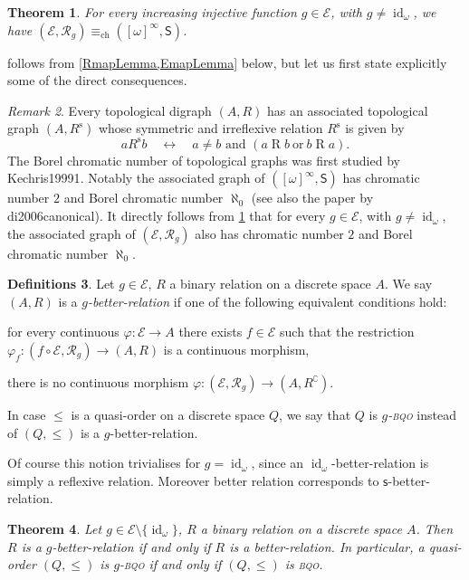\documentclass{article}%
\newcommand\textcite{}
\theoremstyle{plain}
\newtheorem{theorem}{Theorem}
\newtheorem{theorem}{Theorem}[section]
\theoremstyle{definition}
\newtheorem{definition}[theorem]{Definition}
\newtheorem{definition}[theorem]{Notation}
\newtheorem{definition}[theorem]{Notations}
\newtheorem{definition}[theorem]{Definitions}
\theoremstyle{remark}
\newtheorem{remark}[theorem]{Remark}
\newcommand{\bqo}{\textsc{bqo}}
\newcommand{\contMorEq}{\equiv_{\text{ch}}}
\DeclareMathOperator{\id}{\mathrm{id}} %
\newcommand{\SSI}{\quad\longleftrightarrow\quad} %
\newcommand{\SHIFT}{\mathsf{S}}
\newcommand{\infSub}[1]{[#1]^{\infty}}
\newcommand{\Su}{\mathsf{s}}
\newcommand{\IIf}{\mathcal{E}}
\newcommand{\rtrans}[1]{\mathcal{R}_{#1}}
\begin{document}
\begin{theorem}\label{MainProp}
For every increasing injective function $g\in \IIf$, with $g\neq \id_{\omega}$, we have $(\IIf, \rtrans{g})\contMorEq (\infSub{\omega},\SHIFT)$.
\end{theorem}



 follows from \cref{RmapLemma,EmapLemma} below, but let us first state explicitly some of the direct consequences.

\begin{remark}
Every topological digraph $(A,R)$ has an associated topological graph $(A,R^{\text{s}})$ whose symmetric and irreflexive relation $R^{\text{s}}$ is given by
\[
a\mathrel{R^{\text{s}}}b\SSI a\neq b\text{ and } (a\mathrel{R}b \ \text{or}\ b\mathrel{R}a ).
\]
The Borel chromatic number of topological graphs was first studied by \textcite{Kechris19991}. 
Notably the associated graph of $(\infSub{\omega},\SHIFT)$ has chromatic number $2$ and Borel chromatic number $\aleph_{0}$ (see also the paper by \textcite{di2006canonical}). It directly follows from \cref{MainProp} that for every $g\in \IIf$, with $g\neq\id_{\omega}$, the associated graph of $(\IIf, \rtrans{g})$ also has chromatic number $2$ and Borel chromatic number $\aleph_{0}$.
\end{remark}


\begin{definition}
Let $g\in\IIf$, $R$ a binary relation on a discrete space $A$. We say $(A,R)$ is a \emph{$g$-better-relation} if one of the following equivalent conditions hold:
\begin{enumDefn}
\item for every continuous $\varphi:\IIf\to A$ there exists $f\in \IIf$ such that the restriction $\varphi_{f}:(f\circ \IIf, \rtrans{g})\to (A,R)$ is a continuous morphism,
\item there is no continuous morphism $\varphi:(\IIf, \rtrans{g})\to (A,R^{\complement})$.
\end{enumDefn}
In case $\leq$ is a quasi-order on a discrete space $Q$, we say that $Q$ is \emph{$g$-\bqo{}} instead of $(Q,\leq)$ is a $g$-better-relation.
\end{definition}

 Of course this notion trivialises for $g=\id_{\omega}$, since an $\id_{\omega}$-better-relation is simply a reflexive relation. Moreover better relation corresponds to $\Su$-better-relation. 


\begin{theorem}\label{g-BQO}
Let $g\in\IIf\setminus\{\id_{\omega}\}$, $R$ a binary relation on a discrete space $A$. Then $R$ is a $g$-better-relation if and only if $R$ is a better-relation. In particular, a quasi-order $(Q,\leq)$ is $g$-\bqo{} if and only if $(Q,\leq)$ is \bqo{}. 
\end{theorem}
\end{document}
